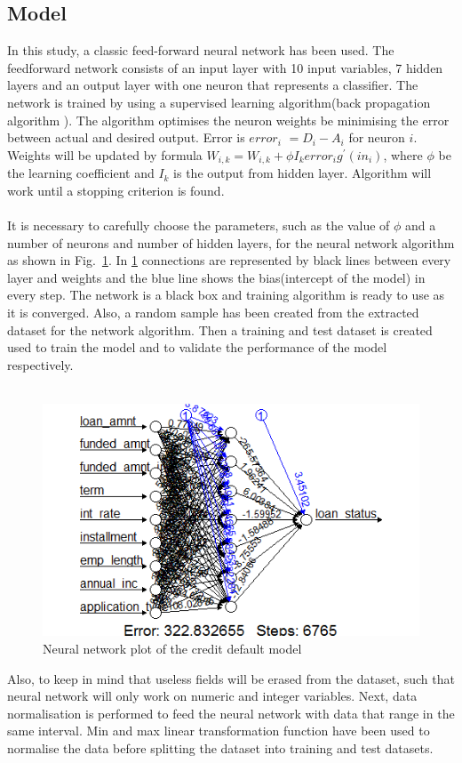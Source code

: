 \documentclass{article}[]
\begin{document}
\subsection{Model}
In this study, a classic feed-forward neural network has been used. The feedforward network consists of an input layer with 10 input variables, 7 hidden layers and an output layer with one neuron that represents a classifier. The network is trained by using a supervised learning algorithm(back propagation algorithm \cite{hecht1988theory}\cite{pineda1987generalization}). The algorithm optimises the neuron weights be minimising the error between actual and desired output. Error is $error_{i}$ $= D_{i} - A_{i}$ for neuron $i$. Weights will be updated by formula $W_{i,k} = W_{i,k} + \phi I_{k}error_{i}g^{'}(in_{i})$, where $\phi$ be the learning coefficient and $I_{k}$ is the output from hidden layer. Algorithm will work until a stopping criterion is found.\\\\
It is necessary to carefully choose the parameters, such as the value of $\phi$ and a number of neurons and number of hidden layers, for the neural network algorithm as shown in Fig.~\ref{fig:nn}. In \ref{fig:nn} connections are represented by black lines between every layer and weights and the blue line shows the bias(intercept of the model) in every step. The network is a black box and training algorithm is ready to use as it is converged.  Also, a random sample has been created from the extracted dataset for the network algorithm. Then a training and test dataset is created used to train the model and to validate the performance of the model respectively.\\\\ 
\begin{figure}[!htb]
\centering
\includegraphics[width=1\textwidth]{nn.png}
\caption{Neural network plot of the credit default model}
\label{fig:nn}
\end{figure}
Also, to keep in mind that useless fields will be erased from the dataset, such that neural network will only work on numeric and integer variables. Next, data normalisation is performed to feed the neural network with data that range in the same interval. Min and max linear transformation function have been used to normalise the data before splitting the dataset into training and test datasets. 
\end{document}
